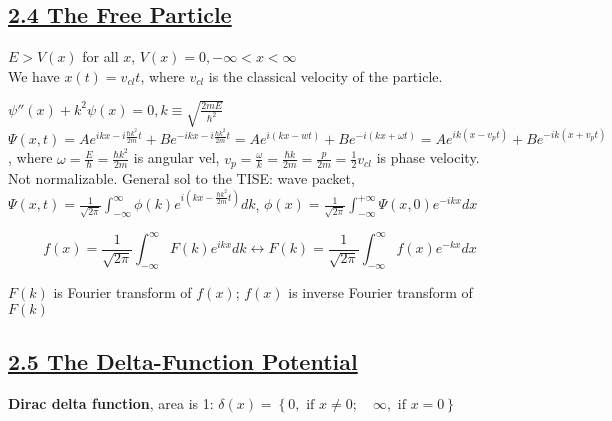 
\subsection{\underline{2.4 The Free Particle}}
$E > V(x)$ for all $x$, $V(x) = 0, -\infty < x < \infty$ \\

We have $x(t) = v_{cl} t$, where $v_{cl}$ is the classical velocity of the particle.

$\psi''(x) + k^2 \psi(x) = 0, k \equiv \sqrt{\frac{2mE}{\hbar^2}}$ \\
$\Psi(x, t) = Ae^{ikx - i \frac{\hbar k^2}{2m} t} + Be^{-ikx - i \frac{\hbar k^2}{2m} t} = A e^{i(kx - wt)} + Be^{-i(kx + \omega t)} = A e^{ik(x - v_p t)} + Be^{-ik(x + v_{p} t)}$,
where $\omega = \frac{E}{\hbar} = \frac{\hbar k^2}{2m}$ is angular vel, $v_p = \frac{\omega}{k} = \frac{\hbar k }{2m} = \frac{p}{2m} = \frac{1}{2} v_{cl}$ is phase velocity. \\

Not normalizable. General sol to the TISE: wave packet, 
\tiny
$\Psi(x, t) = \frac{1}{\sqrt{2\pi}} \int_{-\infty}^{\infty} \phi(k) e^{i (kx - \frac{\hbar k^2}{2m} t)} dk$,
$\phi(x) = \frac{1}{\sqrt{2 \pi}} \int_{-\infty}^{+\infty} \Psi(x, 0) e^{-ikx} dx$
\scriptsize

$$f(x) = \frac{1}{\sqrt{2 \pi}} \int_{-\infty}^{\infty} F(k) e^{ikx} dk \leftrightarrow F(k) = \frac{1}{\sqrt{2\pi}} \int_{-\infty}^{\infty} f(x) e^{-kx} dx$$

$F(k)$ is Fourier transform of $f(x)$; $f(x)$ is inverse Fourier transform of $F(k)$ \\



\subsection{\underline{2.5 The Delta-Function Potential}}

\textbf{Dirac delta function}, area is 1:
$\delta(x) = \left\{ 0, \textrm { if } x \neq 0; \quad \infty, \textrm{ if } x = 0 \right\}$

